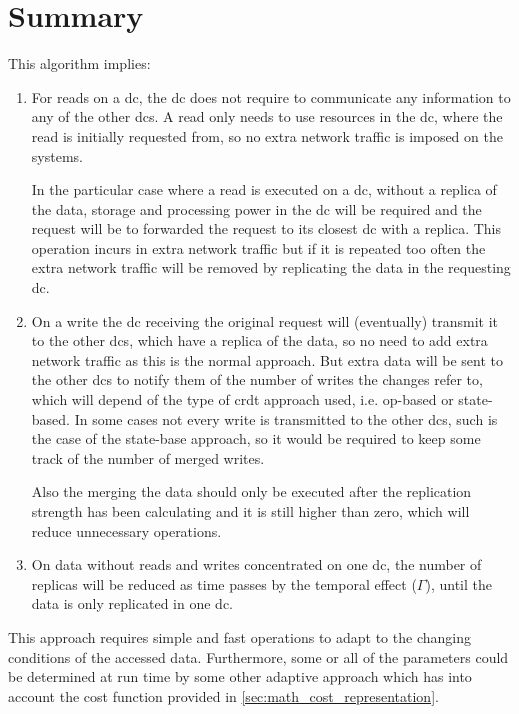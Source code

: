 \documentclass[english]{article}
\begin{document}
\section{Summary}
This algorithm implies:
\begin{enumerate}
	\item For reads on a \gls{dc}, the \gls{dc} does not require to communicate any information to any of the other \glspl{dc}. A read only needs to use resources in the \gls{dc}, where the read is initially requested from, so no extra network traffic is imposed on the systems.
	
	In the particular case where a read is executed on a \gls{dc}, without a replica of the data, storage and processing power in the \gls{dc} will be required and the request will be to forwarded the request to its closest \gls{dc} with a replica. This operation incurs in extra network traffic but if it is repeated too often the extra network traffic will be removed by replicating the data in the requesting \gls{dc}.
	
	\item On a write  the \gls{dc} receiving the original request will (eventually) transmit it to the other \glspl{dc}, which have a replica of the data, so no need to add extra network traffic as this is the normal approach. But extra data will be sent to the other \glspl{dc} to notify them of the number of writes the changes refer to, which will depend of the type of \gls{crdt} approach used, i.e. op-based or state-based. In some cases not every write is transmitted to the other \glspl{dc}, such is the case of the state-base approach, so it would be required to keep some track of the number of merged writes.
	
	Also the merging the data should only be executed after the replication strength has been calculating and it is still higher than zero, which will reduce unnecessary operations.

	\item On data without reads and writes concentrated on one \gls{dc}, the number of replicas will be reduced as time passes by the temporal effect ($\Gamma$), until the data is only replicated in one \gls{dc}.
\end{enumerate}

This approach requires simple and fast operations to adapt to the changing conditions of the accessed data. Furthermore, some or all of the parameters could be determined at run time by some other adaptive approach which has into account the cost function provided in \ref{sec:math_cost_representation}.
\end{document}
